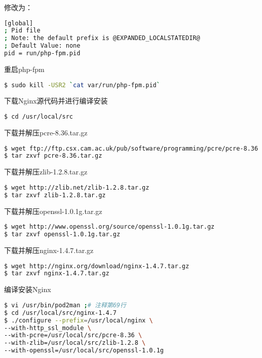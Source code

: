 修改为：

\begin{lstlisting}[language=bash]
[global]
; Pid file
; Note: the default prefix is @EXPANDED_LOCALSTATEDIR@
; Default Value: none
pid = run/php-fpm.pid
\end{lstlisting}

重启php-fpm


\begin{lstlisting}[language=bash]
$ sudo kill -USR2 `cat var/run/php-fpm.pid`
\end{lstlisting}

下载Nginx源代码并进行编译安装


\begin{lstlisting}[language=bash]
$ cd /usr/local/src
\end{lstlisting}


下载并解压pcre-8.36.tar.gz

\begin{lstlisting}[language=bash]
$ wget ftp://ftp.csx.cam.ac.uk/pub/software/programming/pcre/pcre-8.36.tar.gz
$ tar zxvf pcre-8.36.tar.gz
\end{lstlisting}


下载并解压zlib-1.2.8.tar.gz


\begin{lstlisting}[language=bash]
$ wget http://zlib.net/zlib-1.2.8.tar.gz
$ tar zxvf zlib-1.2.8.tar.gz
\end{lstlisting}

下载并解压openssl-1.0.1g.tar.gz


\begin{lstlisting}[language=bash]
$ wget http://www.openssl.org/source/openssl-1.0.1g.tar.gz
$ tar zxvf openssl-1.0.1g.tar.gz
\end{lstlisting}

下载并解压nginx-1.4.7.tar.gz


\begin{lstlisting}[language=bash]
$ wget http://nginx.org/download/nginx-1.4.7.tar.gz
$ tar zxvf nginx-1.4.7.tar.gz
\end{lstlisting}


编译安装Nginx


\begin{lstlisting}[language=bash]
$ vi /usr/bin/pod2man ;# 注释第69行
$ cd /usr/local/src/nginx-1.4.7
$ ./configure --prefix=/usr/local/nginx \
--with-http_ssl_module \
--with-pcre=/usr/local/src/pcre-8.36 \
--with-zlib=/usr/local/src/zlib-1.2.8 \
--with-openssl=/usr/local/src/openssl-1.0.1g
\end{lstlisting}

